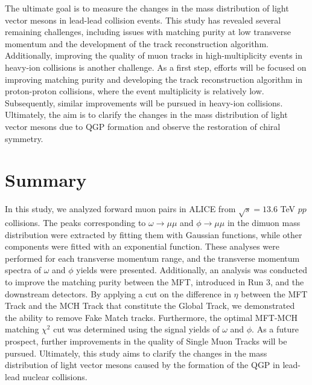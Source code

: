     The ultimate goal is to measure the changes in the mass distribution of light vector mesons in lead-lead collision events. This study has revealed several remaining challenges, including issues with matching purity at low transverse momentum and the development of the track reconstruction algorithm. Additionally, improving the quality of muon tracks in high-multiplicity events in heavy-ion collisions is another challenge. As a first step, efforts will be focused on improving matching purity and developing the track reconstruction algorithm in proton-proton collisions, where the event multiplicity is relatively low. Subsequently, similar improvements will be pursued in heavy-ion collisions. Ultimately, the aim is to clarify the changes in the mass distribution of light vector mesons due to QGP formation and observe the restoration of chiral symmetry.
\section{Summary}
    In this study, we analyzed forward muon pairs in ALICE from $\sqrt{s} = 13.6$ TeV $pp$ collisions. The peaks corresponding to $\omega \rightarrow \mu\mu$ and $\phi \rightarrow \mu\mu$ in the dimuon mass distribution were extracted by fitting them with Gaussian functions, while other components were fitted with an exponential function. These analyses were performed for each transverse momentum range, and the transverse momentum spectra of $\omega$ and $\phi$ yields were presented. Additionally, an analysis was conducted to improve the matching purity between the MFT, introduced in Run 3, and the downstream detectors. By applying a cut on the difference in $\eta$ between the MFT Track and the MCH Track that constitute the Global Track, we demonstrated the ability to remove Fake Match tracks. Furthermore, the optimal MFT-MCH matching $\chi^2$ cut was determined using the signal yields of $\omega$ and $\phi$. As a future prospect, further improvements in the quality of Single Muon Tracks will be pursued. Ultimately, this study aims to clarify the changes in the mass distribution of light vector mesons caused by the formation of the QGP in lead-lead nuclear collisions.